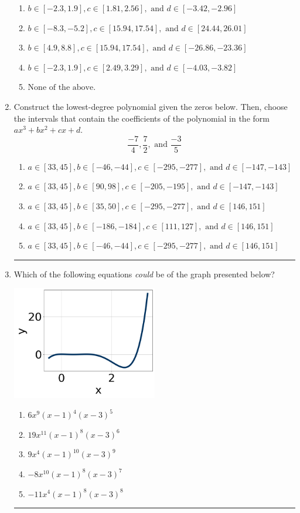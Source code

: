 \documentclass[14pt]{extbook}
\newcommand{\litem}[1]{\item#1\hspace*{-1cm}\rule{\textwidth}{0.4pt}}
\begin{document}
\begin{enumerate}
{\begin{enumerate}[label=\Alph*.]
\item \( b \in [-2.3, 1.9], c \in [1.81, 2.56], \text{ and } d \in [-3.42, -2.96] \)
\item \( b \in [-8.3, -5.2], c \in [15.94, 17.54], \text{ and } d \in [24.44, 26.01] \)
\item \( b \in [4.9, 8.8], c \in [15.94, 17.54], \text{ and } d \in [-26.86, -23.36] \)
\item \( b \in [-2.3, 1.9], c \in [2.49, 3.29], \text{ and } d \in [-4.03, -3.82] \)
\item \( \text{None of the above.} \)

\end{enumerate} }
\litem{
Construct the lowest-degree polynomial given the zeros below. Then, choose the intervals that contain the coefficients of the polynomial in the form $ax^3+bx^2+cx+d$.\[ \frac{-7}{4}, \frac{7}{2}, \text{ and } \frac{-3}{5} \]\begin{enumerate}[label=\Alph*.]
\item \( a \in [33, 45], b \in [-46, -44], c \in [-295, -277], \text{ and } d \in [-147, -143] \)
\item \( a \in [33, 45], b \in [90, 98], c \in [-205, -195], \text{ and } d \in [-147, -143] \)
\item \( a \in [33, 45], b \in [35, 50], c \in [-295, -277], \text{ and } d \in [146, 151] \)
\item \( a \in [33, 45], b \in [-186, -184], c \in [111, 127], \text{ and } d \in [146, 151] \)
\item \( a \in [33, 45], b \in [-46, -44], c \in [-295, -277], \text{ and } d \in [146, 151] \)

\end{enumerate} }
\litem{
Which of the following equations \textit{could} be of the graph presented below?
\begin{center}
    \includegraphics[width=0.5\textwidth]{../Figures/polyGraphToFunctionC.png}
\end{center}
\begin{enumerate}[label=\Alph*.]
\item \( 6x^{9} (x - 1)^{4} (x - 3)^{5} \)
\item \( 19x^{11} (x - 1)^{8} (x - 3)^{6} \)
\item \( 9x^{4} (x - 1)^{10} (x - 3)^{9} \)
\item \( -8x^{10} (x - 1)^{8} (x - 3)^{7} \)
\item \( -11x^{4} (x - 1)^{8} (x - 3)^{8} \)

\end{enumerate} }
\end{enumerate}
\end{document}
